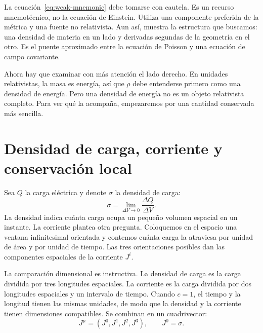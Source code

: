 La ecuación~\eqref{eq:weak-mnemonic} debe tomarse con cautela. Es un recurso mnemotécnico, no la ecuación de Einstein. Utiliza una componente preferida de la métrica y una fuente no relativista. Aun así, muestra la estructura que buscamos: una densidad de materia en un lado y derivadas segundas de la geometría en el otro. Es el puente aproximado entre la ecuación de Poisson y una ecuación de campo covariante.

Ahora hay que examinar con más atención el lado derecho. En unidades relativistas, la masa es energía, así que \(\rho\) debe entenderse primero como una densidad de energía. Pero una densidad de energía no es un objeto relativista completo. Para ver qué la acompaña, empezaremos por una cantidad conservada más sencilla.

\section{Densidad de carga, corriente y conservación local}

Sea \(Q\) la carga eléctrica y denote \(\sigma\) la densidad de carga:
\begin{equation}
 \sigma=\lim_{\Delta V\to0}\frac{\Delta Q}{\Delta V}.
\end{equation}
La densidad indica cuánta carga ocupa un pequeño volumen espacial en un instante. La corriente plantea otra pregunta. Coloquemos en el espacio una ventana infinitesimal orientada y contemos cuánta carga la atraviesa por unidad de área y por unidad de tiempo. Las tres orientaciones posibles dan las componentes espaciales de la corriente \(J^i\).

La comparación dimensional es instructiva. La densidad de carga es la carga dividida por tres longitudes espaciales. La corriente es la carga dividida por dos longitudes espaciales y un intervalo de tiempo. Cuando \(c=1\), el tiempo y la longitud tienen las mismas unidades, de modo que la densidad y la corriente tienen dimensiones compatibles. Se combinan en un cuadrivector:
\begin{equation}
 J^\mu=(J^0,J^1,J^2,J^3),
 \qquad J^0=\sigma.
\end{equation}

